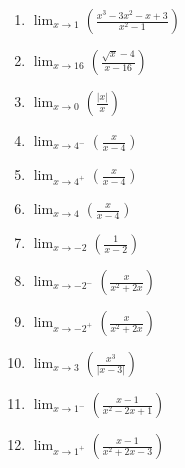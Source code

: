 \documentclass[12pt]{article}
\newif\ifans
\begin{document}
\begin{enumerate}
\ifans{\fbox{8}} \fi

\item $\displaystyle \lim_{x \rightarrow 1}{\left(\frac{x^3-3x^2-x+3}{x^2-1}\right)}$

\ifans{\fbox{$-2$}} \fi

\item $\displaystyle \lim_{x\rightarrow 16}{\left(\frac{\sqrt{x}-4}{x-16}\right)}$

\ifans{\fbox{$\displaystyle \frac{1}{8}$}} \fi

\item $\lim_{x \rightarrow 0}\left(\frac{|x|}{x}\right)$

\ifans{\fbox{DNE}} \fi

\item $\displaystyle \lim_{x\rightarrow 4^-}{\left(\frac {x}{x-4}\right)}$

\ifans{\fbox{$-\infty$}} \fi

\item  $\displaystyle \lim_{x\rightarrow 4^+}{\left(\frac{x}{x-4}\right)}$

\ifans{\fbox{$+\infty$}} \fi

\item $\displaystyle \lim_{x\rightarrow 4}{\left(\frac{x}{x-4}\right)}$

\ifans{\fbox{DNE}} \fi

\item $\displaystyle \lim_{x\rightarrow -2}{\left(\frac{1}{x-2}\right)}$

\ifans{\fbox{$\displaystyle -\frac{1}{4}$}} \fi

\item $\displaystyle \lim_{x\rightarrow -2^-}{\left(\frac{x}{x^2+2x}\right)}$

\ifans{\fbox{$-\infty$}} \fi

\item $\displaystyle \lim_{x\rightarrow -2^+}{\left(\frac{x}{x^2+2x}\right)}$

\ifans{\fbox{$+\infty$}} \fi
 
\item $\displaystyle \lim_{x\rightarrow 3}{\left(\frac{x^3}{|x-3|}\right)}$

\ifans{\fbox{$+\infty$}} \fi

\item $\displaystyle \lim_{x \rightarrow 1^-}{\left(\frac{x-1}{x^2-2x+1}\right)}$

\ifans{\fbox{$-\infty$}} \fi

\item $\displaystyle \lim_{x \rightarrow 1^+}{\left(\frac{x-1}{x^2+2x-3}\right)}$


\end{enumerate}
\end{document}
